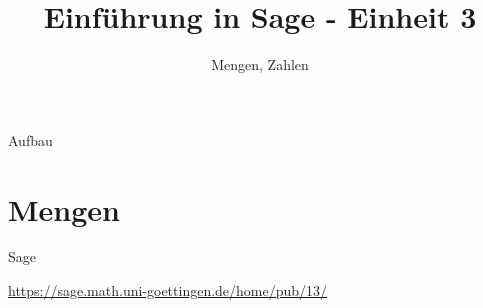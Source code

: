 \documentclass[hyperref={xetex}]{beamer}
\title{Einführung in Sage - Einheit 3}
\subtitle{Mengen, Zahlen}
\begin{document}
\titlepage

\begin{frame}{Aufbau}
\tableofcontents
\end{frame}

\section{Mengen}




\begin{frame}{Sage}
\begin{center}
\url{https://sage.math.uni-goettingen.de/home/pub/13/}
\end{center}
\end{frame}



\end{document}
